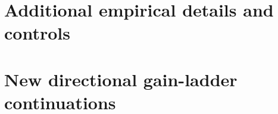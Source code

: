 \documentclass{article}
\theoremstyle{definition}
\begin{document}
\section{Additional empirical details and controls}

\clearpage
\section{New directional gain-ladder continuations}
\label{app:directional-ladders}


\end{document}
